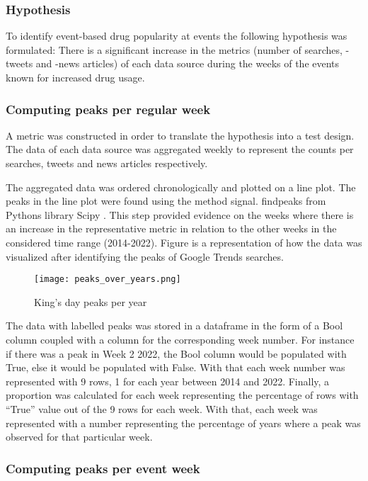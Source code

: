 \subsubsection{Hypothesis}

To identify event-based drug popularity at events the following
hypothesis was formulated:
There is a significant increase in the metrics (number of
searches, -tweets and -news articles) of each data source during
the weeks of the events known for increased drug usage. 

\subsubsection{Computing peaks per regular week}

A metric was constructed in order to translate the hypothesis
into a test design. The data of each data source was aggregated
weekly to represent the counts per searches, tweets and news
articles respectively. 

The aggregated data was ordered chronologically and plotted on a
line plot. The peaks in the line plot were found using the
method signal. findpeaks from Pythons library Scipy \cite{scipy}. 
This step provided evidence on the weeks where there is an
increase in the representative metric in relation to the other
weeks in the considered time range (2014-2022). Figure \label{fig:peaks} is a representation of how the data was visualized after identifying the peaks of Google Trends searches.

\begin{figure}[h]
    \texttt{[image: peaks\_over\_years.png]}
    \caption{}{King's day peaks per year}
    \label{fig:peaks}
\end{figure}

The data with labelled peaks was stored in a dataframe in the
form of a Bool column coupled with a column for the
corresponding week number. For instance if there was a peak in
Week 2 2022, the Bool column would be populated with True, else
it would be populated with False. With that each week number was
represented with 9 rows, 1 for each year between 2014 and 2022. 
Finally, a proportion was calculated for each week representing
the percentage of rows with “True” value out of the 9 rows for
each week. With that, each week was represented with a number
representing the percentage of years where a peak was observed
for that particular week.

\subsubsection{Computing peaks per event week}

